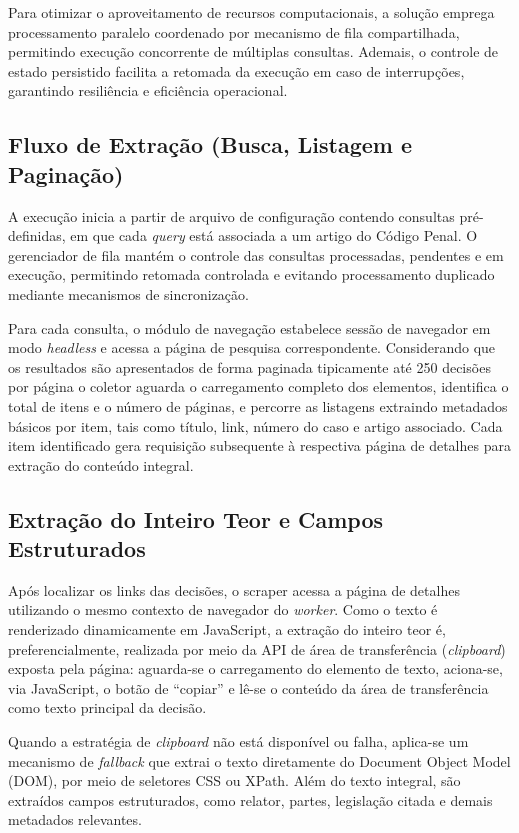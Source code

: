 Para otimizar o aproveitamento de recursos computacionais, a solução emprega processamento paralelo coordenado por mecanismo de fila compartilhada, permitindo execução concorrente de múltiplas consultas. Ademais, o controle de estado persistido facilita a retomada da execução em caso de interrupções, garantindo resiliência e eficiência operacional.

\subsection{Fluxo de Extração (Busca, Listagem e Paginação)}
A execução inicia a partir de arquivo de configuração contendo consultas pré-definidas, em que cada \textit{query} está associada a um artigo do Código Penal. O gerenciador de fila mantém o controle das consultas processadas, pendentes e em execução, permitindo retomada controlada e evitando processamento duplicado mediante mecanismos de sincronização.

Para cada consulta, o módulo de navegação estabelece sessão de navegador em modo \textit{headless} e acessa a página de pesquisa correspondente. Considerando que os resultados são apresentados de forma paginada tipicamente até 250 decisões por página o coletor aguarda o carregamento completo dos elementos, identifica o total de itens e o número de páginas, e percorre as listagens extraindo metadados básicos por item, tais como título, link, número do caso e artigo associado. Cada item identificado gera requisição subsequente à respectiva página de detalhes para extração do conteúdo integral.

\subsection{Extração do Inteiro Teor e Campos Estruturados}
Após localizar os links das decisões, o scraper acessa a página de detalhes utilizando o mesmo contexto de navegador do \textit{worker}. Como o texto é renderizado dinamicamente em JavaScript, a extração do inteiro teor é, preferencialmente, realizada por meio da API de área de transferência (\textit{clipboard}) exposta pela página: aguarda-se o carregamento do elemento de texto, aciona-se, via JavaScript, o botão de ``copiar'' e lê-se o conteúdo da área de transferência como texto principal da decisão.

Quando a estratégia de \textit{clipboard} não está disponível ou falha, aplica-se um mecanismo de \textit{fallback} que extrai o texto diretamente do Document Object Model (DOM), por meio de seletores CSS ou XPath. Além do texto integral, são extraídos campos estruturados, como relator, partes, legislação citada e demais metadados relevantes.

